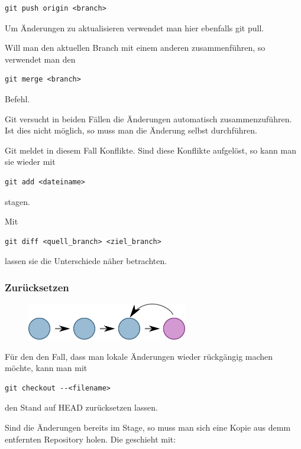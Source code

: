 \begin{verbatim}
git push origin <branch>
\end{verbatim}

Um Änderungen zu aktualisieren verwendet man hier ebenfalls git pull.

Will man den aktuellen Branch mit einem anderen zusammenführen, so verwendet man den
\begin{verbatim}
git merge <branch>
\end{verbatim}
Befehl.

Git versucht in beiden Fällen die Änderungen automatisch zusammenzuführen.
Ist dies nicht möglich, so muss man die Änderung selbst durchführen.

Git meldet in diesem Fall Konflikte.
Sind diese Konflikte aufgelöst, so kann man sie wieder mit

\begin{verbatim}
git add <dateiname> 
\end{verbatim}

stagen.

Mit 

\begin{verbatim}
git diff <quell_branch> <ziel_branch>
\end{verbatim}

lassen sie die Unterschiede näher betrachten.

\subsubsection{Zurücksetzen}

\begin{figure}[htb]
\begin{center}
\includegraphics[width=7cm]{bilder/back.pdf}
\end{center} 
\end{figure}
Für den den Fall, dass man lokale Änderungen wieder rückgängig machen möchte, kann man mit

\begin{verbatim}
git checkout --<filename>
\end{verbatim}

den Stand auf HEAD zurücksetzen lassen.

Sind die Änderungen bereits im Stage, so muss man sich eine Kopie aus demm entfernten Repository holen.
Die geschieht mit:

